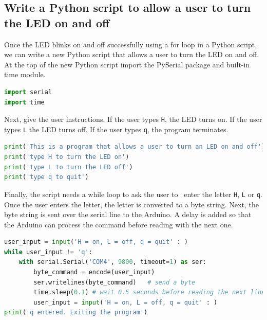 \documentclass{book}
\begin{document}
    
        \subsection{Write a Python script to allow a user to turn the LED on and
off}\label{write-a-python-script-to-allow-a-user-to-turn-the-led-on-and-off}
    




    
        Once the LED blinks on and off successfully using a for loop in a Python
script, we can write a new Python script that allows a user to turn the
LED on and off. At the top of the new Python script import the PySerial
package and built-in time module.
    




    
        \begin{lstlisting}[language=Python]
import serial
import time
\end{lstlisting}
    




    
        Next, give the user instructions. If the user types \lstinline!H!, the
LED turns on. If the user types \lstinline!L! the LED turns off. If the
user types \lstinline!q!, the program terminates.
    




    
        \begin{lstlisting}[language=Python]
print('This is a program that allows a user to turn an LED on and off')
print('type H to turn the LED on')
print('type L to turn the LED off')
print('type q to quit')
\end{lstlisting}
    




    
        Finally, the script needs a while loop to ask the user to~ enter the
letter \lstinline!H!, \lstinline!L! or \lstinline!q!. Once the user
enters the letter, the letter is converted to a byte string. Next, the
byte string is sent over the serial line to the Arduino. A delay is
added so that the Arduino can process the command before reading with
the next one.
    




    
        \begin{lstlisting}[language=Python]
user_input = input('H = on, L = off, q = quit' : )
while user_input != 'q':
    with serial.Serial('COM4', 9800, timeout=1) as ser:
        byte_command = encode(user_input)
        ser.writelines(byte_command)   # send a byte
        time.sleep(0.1) # wait 0.5 seconds before reading the next line
        user_input = input('H = on, L = off, q = quit' : )
print('q entered. Exiting the program')
\end{lstlisting}
    
\end{document}

